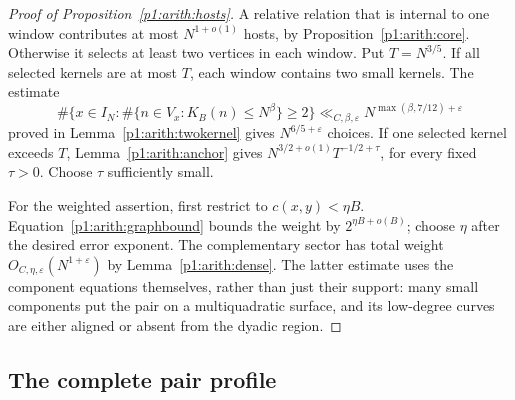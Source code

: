 \begin{proof}[Proof of Proposition~\ref{p1:arith:hosts}]
A relative relation that is internal to one window contributes at most
$N^{1+o(1)}$ hosts, by Proposition~\ref{p1:arith:core}.  Otherwise it selects
at least two vertices in each window.  Put $T=N^{3/5}$.  If all selected
kernels are at most $T$, each window contains two small kernels.  The estimate
\begin{equation}\label{p1:arith:twokernelused}
 \#\{x\in I_N:\#\{n\in V_x:K_B(n)\leq N^\beta\}\geq2\}
   \ll_{C,\beta,\varepsilon}N^{\max(\beta,7/12)+\varepsilon}
\end{equation}
proved in Lemma~\ref{p1:arith:twokernel} gives $N^{6/5+\varepsilon}$
choices.  If one selected kernel exceeds $T$, Lemma~\ref{p1:arith:anchor}
gives
$N^{3/2+o(1)}T^{-1/2+\tau}$, for every fixed $\tau>0$.
Choose $\tau$ sufficiently small.

For the weighted assertion, first restrict to $c(x,y)<\eta B$.
Equation~\eqref{p1:arith:graphbound} bounds the weight by
$2^{\eta B+o(B)}$; choose $\eta$ after the desired error exponent.
The complementary sector has total weight $O_{C,\eta,\varepsilon}(N^{1+\varepsilon})$
by Lemma~\ref{p1:arith:dense}.  The latter estimate uses the component
equations themselves, rather than just their support: many small components
put the pair on a multiquadratic surface, and its low-degree curves are either
aligned or absent from the dyadic region.
\end{proof}

\subsection{The complete pair profile}
\label{p14:comp:complete-profile}

